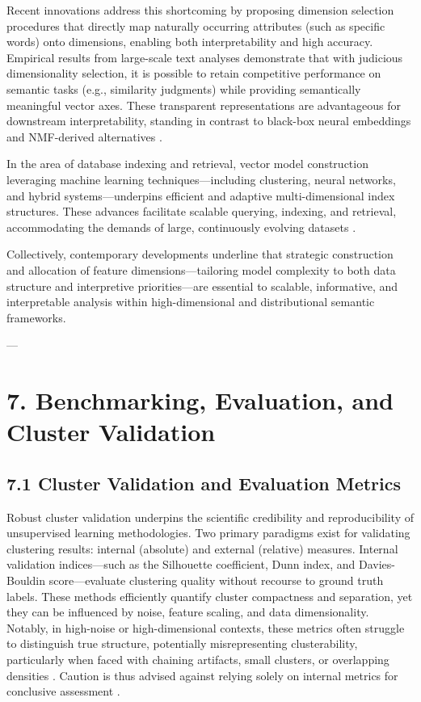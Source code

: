 \documentclass[11pt]{article}
\begin{document}
Recent innovations address this shortcoming by proposing dimension selection procedures that directly map naturally occurring attributes (such as specific words) onto dimensions, enabling both interpretability and high accuracy. Empirical results from large-scale text analyses demonstrate that with judicious dimensionality selection, it is possible to retain competitive performance on semantic tasks (e.g., similarity judgments) while providing semantically meaningful vector axes. These transparent representations are advantageous for downstream interpretability, standing in contrast to black-box neural embeddings and NMF-derived alternatives \cite{ref115}.

In the area of database indexing and retrieval, vector model construction leveraging machine learning techniques—including clustering, neural networks, and hybrid systems—underpins efficient and adaptive multi-dimensional index structures. These advances facilitate scalable querying, indexing, and retrieval, accommodating the demands of large, continuously evolving datasets \cite{ref113}.

Collectively, contemporary developments underline that strategic construction and allocation of feature dimensions—tailoring model complexity to both data structure and interpretive priorities—are essential to scalable, informative, and interpretable analysis within high-dimensional and distributional semantic frameworks.

---

\section{7. Benchmarking, Evaluation, and Cluster Validation}

\subsection{7.1 Cluster Validation and Evaluation Metrics}

Robust cluster validation underpins the scientific credibility and reproducibility of unsupervised learning methodologies. Two primary paradigms exist for validating clustering results: internal (absolute) and external (relative) measures. Internal validation indices—such as the Silhouette coefficient, Dunn index, and Davies-Bouldin score—evaluate clustering quality without recourse to ground truth labels. These methods efficiently quantify cluster compactness and separation, yet they can be influenced by noise, feature scaling, and data dimensionality. Notably, in high-noise or high-dimensional contexts, these metrics often struggle to distinguish true structure, potentially misrepresenting clusterability, particularly when faced with chaining artifacts, small clusters, or overlapping densities \cite{ref14,ref16,ref17,ref20,ref21,ref22,ref45,ref46,ref50,ref59,ref60,ref67,ref71,ref72,ref74,ref75,ref78,ref90,ref92,ref93,ref94,ref95,ref96,ref97,ref100,ref113}. Caution is thus advised against relying solely on internal metrics for conclusive assessment \cite{ref14,ref94}.
\end{document}

